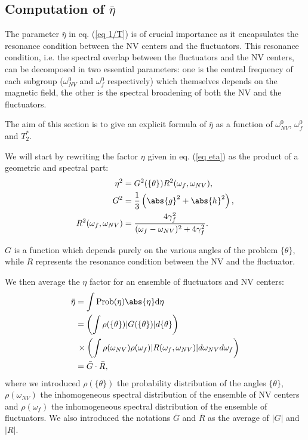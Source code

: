 \documentclass[a4paper, 11pt]{report}
\begin{document}
\subsection{Computation of $\bar \eta$}
\label{sec computation eta}

The parameter $\bar \eta$ in eq. (\ref{eq 1/T}) is of crucial importance as it encapsulates the resonance condition between the NV centers and the fluctuators. This resonance condition, i.e. the spectral overlap between the fluctuators and the NV centers, can be decomposed in two essential parameters: one is the central frequency of each subgroup ($\omega_{NV}^0$ and $\omega_{f}^0$ respectively) which themselves depends on the magnetic field, the other is the spectral broadening of both the NV and the fluctuators. 

The aim of this section is to give an explicit formula of $\bar \eta$ as a function of $\omega_{NV}^0$, $\omega_{f}^0$ and $T_2^*$.

We will start by rewriting the factor $\eta$ given in eq. (\ref{eq eta}) as the product of a geometric and spectral part:
\begin{align}
\eta^2&=G^2(\{\theta\}) R^2(\omega_f,\omega_{NV}), \\
G^2&=\frac{1}{3}\left(\abs{g}^2+\abs{h}^2 \right), \\ 
R^2(\omega_f,\omega_{NV}) &= \frac{4\gamma_f^2}{(\omega_f - \omega_{NV})^2+4\gamma_f^2}.
\end{align}

$G$ is a function which depends purely on the various angles of the problem $\{\theta\}$, while $R$ represents the resonance condition between the NV and the fluctuator.

We then average the $\eta$ factor for an ensemble of fluctuators and NV centers:
\begin{align*}
\bar \eta &= \int \rm{Prob}(\eta) \abs{\eta} d\eta \\
&= \left(\int \rho(\{\theta\}) |G(\{\theta\})| d\{\theta\} \right) \\
&\, \times \left( \int \rho(\omega_{NV}) \rho(\omega_{f}) |R(\omega_f,\omega_{NV})| d\omega_{NV} d\omega_{f} \right) \\
&= \bar G \cdot \bar R,
\end{align*}
where we introduced $\rho(\{\theta\})$ the probability distribution of the angles $\{\theta\}$, $\rho(\omega_{NV})$ the inhomogeneous spectral distribution of the ensemble of NV centers and $\rho(\omega_{f})$ the inhomogeneous spectral distribution of the ensemble of fluctuators. We also introduced the notations $\bar G$ and $\bar R$ as the average of $|G|$ and $|R|$.
\end{document}

